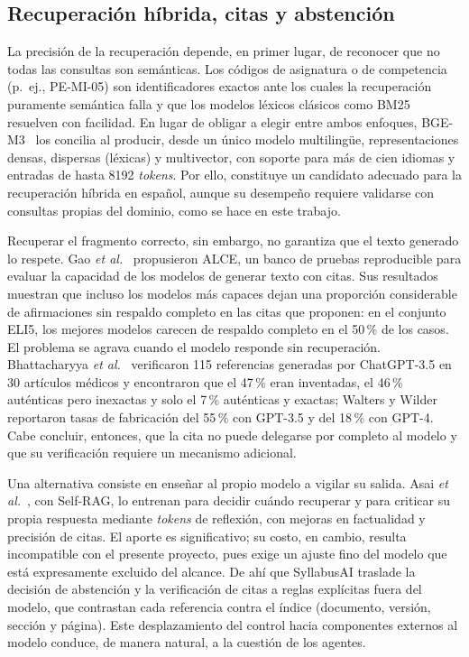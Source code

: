 \subsection{Recuperación híbrida, citas y abstención}
La precisión de la recuperación depende, en primer lugar, de reconocer que no todas las consultas son semánticas. Los códigos de asignatura o de competencia (p.~ej., PE-MI-05) son identificadores exactos ante los cuales la recuperación puramente semántica falla y que los modelos léxicos clásicos como BM25~\cite{robertson2009bm25} resuelven con facilidad. En lugar de obligar a elegir entre ambos enfoques, BGE-M3~\cite{chen2024bgem3} los concilia al producir, desde un único modelo multilingüe, representaciones densas, dispersas (léxicas) y multivector, con soporte para más de cien idiomas y entradas de hasta 8192 \textit{tokens}. Por ello, constituye un candidato adecuado para la recuperación híbrida en español, aunque su desempeño requiere validarse con consultas propias del dominio, como se hace en este trabajo.

Recuperar el fragmento correcto, sin embargo, no garantiza que el texto generado lo respete. Gao \textit{et al.}~\cite{gao2023alce} propusieron ALCE, un banco de pruebas reproducible para evaluar la capacidad de los modelos de generar texto con citas. Sus resultados muestran que incluso los modelos más capaces dejan una proporción considerable de afirmaciones sin respaldo completo en las citas que proponen: en el conjunto ELI5, los mejores modelos carecen de respaldo completo en el 50\,\% de los casos. El problema se agrava cuando el modelo responde sin recuperación. Bhattacharyya \textit{et al.}~\cite{bhattacharyya2023fabricated} verificaron 115 referencias generadas por ChatGPT-3.5 en 30 artículos médicos y encontraron que el 47\,\% eran inventadas, el 46\,\% auténticas pero inexactas y solo el 7\,\% auténticas y exactas; Walters y Wilder~\cite{walters2023fabrication} reportaron tasas de fabricación del 55\,\% con GPT-3.5 y del 18\,\% con GPT-4. Cabe concluir, entonces, que la cita no puede delegarse por completo al modelo y que su verificación requiere un mecanismo adicional.

Una alternativa consiste en enseñar al propio modelo a vigilar su salida. Asai \textit{et al.}~\cite{asai2024selfrag}, con Self-RAG, lo entrenan para decidir cuándo recuperar y para criticar su propia respuesta mediante \textit{tokens} de reflexión, con mejoras en factualidad y precisión de citas. El aporte es significativo; su costo, en cambio, resulta incompatible con el presente proyecto, pues exige un ajuste fino del modelo que está expresamente excluido del alcance. De ahí que SyllabusAI traslade la decisión de abstención y la verificación de citas a reglas explícitas fuera del modelo, que contrastan cada referencia contra el índice (documento, versión, sección y página). Este desplazamiento del control hacia componentes externos al modelo conduce, de manera natural, a la cuestión de los agentes.

